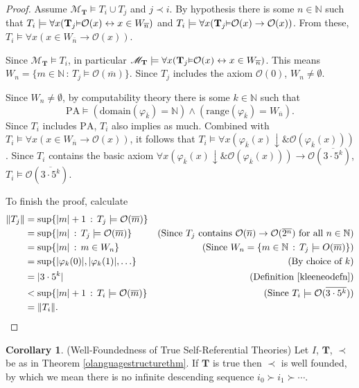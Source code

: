 \documentclass[reqno]{article}
\theoremstyle{definition}
\newtheorem{corollary}[theorem]{Corollary}
\def\N{\mathbb{N}}
\def\M{\mathscr{M}}
\def\T{\mathbf{T}}
\def\O{\mathcal{O}}
\renewcommand{\Pr}[1]{\T_{#1}\mbox{\small${\vDash}$}}
\begin{document}
\begin{proof}
Assume $\M_\T\models T_i\cup T_j$ and $j\prec i$.
By hypothesis
there is some $n\in\N$ such that $T_i\models\forall x(\Pr j\O(x)\leftrightarrow x\in W_{\overline n})$
and $T_i\models\forall x(\Pr j\O(x)\rightarrow\O(x))$.
From these, $T_i\models\forall x(x\in W_{\overline n}\rightarrow \O(x))$.

Since $\M_\T\models T_i$,
in particular $\M_\T\models \forall x(\Pr j\O(x)\leftrightarrow x\in W_{\overline n})$.
This means $W_n=\{m\in\N\,:\,T_j\models\O(\overline m)\}$.
Since $T_j$ includes the axiom $\O(0)$,
$W_n\not=\emptyset$.

Since $W_n\not=\emptyset$,
by computability theory
there is some $k\in\N$ such that
\[
\mathrm{PA} \models (\mathrm{domain}(\varphi_{\overline k})=\N)\wedge (\mathrm{range}(\varphi_{\overline k})=W_{\overline n}). 
\]
Since $T_i$ includes $\mathrm{PA}$,
$T_i$ also implies as much.
Combined with
$T_i\models\forall x(x\in W_{\overline n}\rightarrow\O(x))$,
it follows that
$T_i\models
\forall x(\varphi_{\overline{k}}(x){\downarrow} \mathrel{\&} \O(\varphi_{\overline{k}}(x)))$.
Since $T_i$ contains
the basic axiom
$\forall x(\varphi_{\overline k}(x){\downarrow}
\mathrel\& \O(\varphi_{\overline k}(x)))\rightarrow\O(\overline{3\cdot 5^k})$,
$T_i\models \O(\overline{3\cdot 5^k})$.

To finish the proof, calculate
\begin{align*}
\|T_j\|
&=
\sup\{|m|+1\,:\,T_j\models\O(\overline m)\}\\
&=
\sup\{|m|\,:\,T_j\models\O(\overline m)\}
  &\mbox{(Since $T_j$ contains $\O(\overline n)\rightarrow\O(\overline{2^n})$ for all $n\in\N$)}\\
&=
\sup\{|m|\,:\,m\in W_n\}
  &\mbox{(Since $W_n=\{m\in\N\,:\,T_j\models O(\overline m)\}$)}\\
&=
\sup\{|\varphi_k(0)|,|\varphi_k(1)|,\ldots\}
  &\mbox{(By choice of $k$)}\\
&=
|3\cdot 5^k|
  &\mbox{(Definition \ref{kleeneodefn})}\\
&<
\sup\{|m|+1\,:\,T_i\models \O(\overline m)\}
  &\mbox{(Since $T_i\models \O(\overline{3\cdot 5^k})$)}\\
&=
\|T_i\|.
\end{align*}
\end{proof}


\begin{corollary}
\label{olanguagewellfounded}
(Well-Foundedness of True Self-Referential Theories)
Let $I$, $\T$, $\prec$ be as in Theorem \ref{olanguagestructurethm}.
If $\T$ is true then $\prec$ is well founded,
by which we mean there is no infinite descending sequence
$i_0\succ i_1\succ\cdots$.
\end{corollary}
\end{document}
